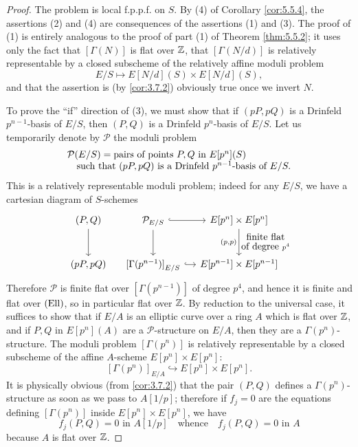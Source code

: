 \begin{proof}
The problem is local f.p.p.f. on $S$. By (4) of Corollary \ref{cor:5.5.4}, the assertions (2) and (4) are consequences of the assertions (1) and (3). The proof of (1) is entirely analogous to the proof of part (1) of Theorem \ref{thm:5.5.2}; it uses only the fact that $[\Gamma(N)]$ is flat over $\mathbb{Z}$, that $[\Gamma(N/d)]$ is relatively representable by a closed subscheme of the relatively affine moduli problem
\[
E/S \longmapsto E[N/d](S) \times E[N/d](S),
\]
and that the assertion is (by \ref{cor:3.7.2}) obviously true once we invert $N$.

To prove the ``if'' direction of (3), we must show that if $(pP, pQ)$ is a Drinfeld $p^{n-1}$-basis of $E/S$, then $(P, Q)$ is a Drinfeld $p^n$-basis of $E/S$. Let us temporarily denote by $\mathcal{P}$ the moduli problem
\[
\begin{array}{@{}l@{}}
\mathcal{P}(E/S) = \text{pairs of points } P, Q \text{ in } E[p^n](S) \\
\quad\text{such that } (pP, pQ) \text{ is a Drinfeld } p^{n-1}\text{-basis of } E/S.
\end{array}
\]
This is a relatively representable moduli problem; indeed for any $E/S$, we have a cartesian diagram of $S$-schemes
\[
\begin{tikzcd}[row sep=large, column sep=small]
(P, Q) \arrow[d] & \mathcal{P}_{E/S} \arrow[r, hook] \arrow[d] & E[p^n] \times E[p^n] \arrow[d, "{(p,p)}"', "{\shortstack{finite flat\\of degree $p^4$}}"] \\
(pP, pQ) & {[\Gamma(p^{n-1})]}_{E/S} \arrow[r, hook] & E[p^{n-1}] \times E[p^{n-1}]
\end{tikzcd}
\]
Therefore $\mathcal{P}$ is finite flat over $[\Gamma(p^{n-1})]$ of degree $p^4$, and hence it is finite and flat over $(\mathrm{Ell})$, so in particular flat over $\mathbb{Z}$. By reduction to the universal case, it suffices to show that if $E/A$ is an elliptic curve over a ring $A$ which is flat over $\mathbb{Z}$, and if $P, Q$ in $E[p^n](A)$ are a $\mathcal{P}$-structure on $E/A$, then they are a $\Gamma(p^n)$-structure. The moduli problem $[\Gamma(p^n)]$ is relatively representable by a closed subscheme of the affine $A$-scheme $E[p^n] \times E[p^n]$:
\[
[\Gamma(p^n)]_{E/A} \hookrightarrow E[p^n] \times E[p^n].
\]
It is physically obvious (from \ref{cor:3.7.2}) that the pair $(P, Q)$ defines a $\Gamma(p^n)$-structure as soon as we pass to $A[1/p]$; therefore if $f_j = 0$ are the equations defining $[\Gamma(p^n)]$ inside $E[p^n] \times E[p^n]$, we have
\[
f_j(P, Q) = 0 \text{ in } A[1/p] \quad\text{whence}\quad f_j(P, Q) = 0 \text{ in } A
\]
because $A$ is flat over $\mathbb{Z}$.
\end{proof}

